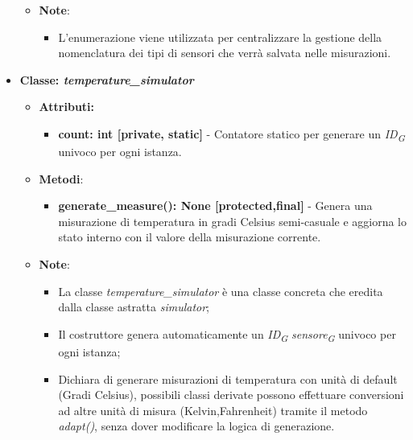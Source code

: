 \begin{itemize}
\begin{itemize}
        \item \textbf{Note}:
        \begin{itemize}
            \item L'enumerazione viene utilizzata per centralizzare la gestione della nomenclatura dei tipi di sensori che verrà salvata nelle misurazioni.
        \end{itemize}
    \end{itemize}
        
    \item{\textbf{Classe: \textit{temperature\_simulator}}}
    \begin{itemize}
        \item \textbf{Attributi:}
        \begin{itemize}
            \item \textbf{count: int [private, static]} - Contatore statico per generare un \textit{ID}\textsubscript{\textit{G}} univoco per ogni istanza.
        \end{itemize}
        \item\textbf{Metodi}: 
        \begin{itemize}
            \item \textbf{generate\_measure(): None [protected,final]} - Genera una misurazione di temperatura in gradi Celsius semi-casuale e aggiorna lo stato interno con il valore della misurazione corrente.
        \end{itemize}
        \item\textbf{Note}:
        \begin{itemize}
            \item La classe \textit{temperature\_simulator} è una classe concreta che eredita dalla classe astratta \textit{simulator};
            \item Il costruttore genera automaticamente un \textit{ID}\textsubscript{\textit{G}} \textit{sensore}\textsubscript{\textit{G}} univoco per ogni istanza;
            \item Dichiara di generare misurazioni di temperatura con unità di default (Gradi Celsius), possibili classi derivate possono effettuare conversioni ad altre unità di misura (Kelvin,Fahrenheit) tramite il metodo \textit{adapt()}, senza dover modificare la logica di generazione.
        \end{itemize}
    \end{itemize}
    

\end{itemize}
